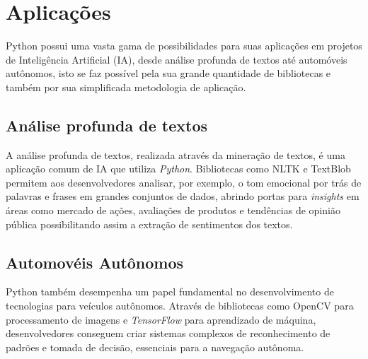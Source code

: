 \section{Aplicações}

Python possui uma vasta gama de possibilidades para suas aplicações em projetos de Inteligência Artificial (IA), desde análise profunda de textos até automóveis autônomos, isto se faz possível pela sua grande quantidade de bibliotecas e também por sua simplificada metodologia de aplicação.\cite{didatica2024}

\subsection{Análise profunda de textos}

A análise profunda de textos, realizada através da mineração de textos, é uma aplicação comum de IA que utiliza \textit{Python}. Bibliotecas como NLTK e TextBlob permitem aos desenvolvedores analisar, por exemplo, o tom emocional por trás de palavras e frases em grandes conjuntos de dados, abrindo portas para \textit{insights} em áreas como mercado de ações, avaliações de produtos e tendências de opinião pública possibilitando assim a extração de sentimentos dos textos.\cite{didatica2024}

\subsection{Automovéis Autônomos}

Python também desempenha um papel fundamental no desenvolvimento de tecnologias para veículos autônomos. Através de bibliotecas como OpenCV para processamento de imagens e \textit{TensorFlow} para aprendizado de máquina, desenvolvedores conseguem criar sistemas complexos de reconhecimento de padrões e tomada de decisão, essenciais para a navegação autônoma.\cite{didatica2024}